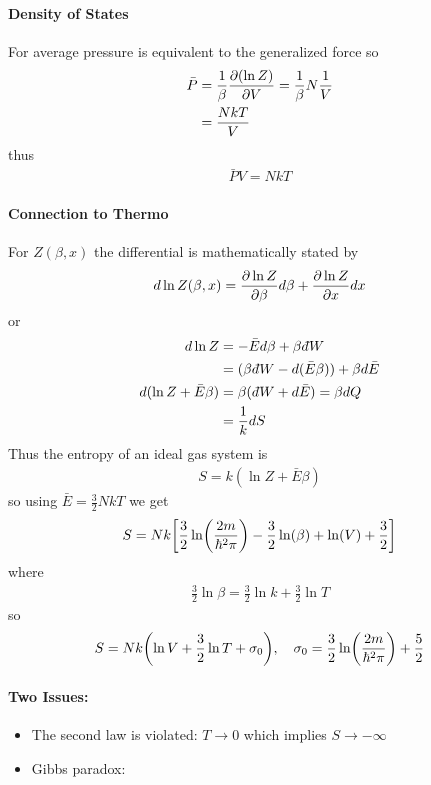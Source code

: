 \documentclass[../main.tex]{subfiles}
\begin{document}
\paragraph{Density of States} For average pressure is equivalent to the generalized force so
\begin{align*}
    \bar P &= \frac{1}{\beta} \pdv{(\ln Z)}{V} = \frac{1}{\beta} N \frac{1}{V} \\
    &= \frac{NkT}{V}
\end{align*}
thus
\begin{align*}
    \bar P V = NkT 
\end{align*}

\paragraph{Connection to Thermo} For $Z(\beta, x)$ the differential is mathematically stated by
\begin{align*}
    d\ln Z(\beta, x) = \pdv{\ln Z}{\beta} d\beta + \pdv{\ln Z}{x} dx 
\end{align*}
or 
\begin{align*}
    d \ln Z &= -\bar E d\beta + \beta d\hspace*{-0.08em}\bar{}\hspace*{0.1em} W \\
    &= (\beta d\hspace*{-0.08em}\bar{}\hspace*{0.1em} W - d(\bar E \beta)) + \beta d \bar E \\
    d(\ln Z + \bar E \beta) &= \beta(d\hspace*{-0.08em}\bar{}\hspace*{0.1em} W + d\bar E) = \beta dQ \\
    &= \frac{1}{k} dS
\end{align*}
Thus the entropy of an ideal gas system is
\begin{align*}
    S = k(\ln Z + \bar E \beta)
\end{align*}
so using $\bar E = \frac{3}{2} N kT$ we get
\begin{align*}
    S = Nk \qt[
        \frac{3}{2} \ln(\frac{2m}{\hbar^2\pi}) - \frac{3}{2} \ln(\beta) + \ln(V) + \frac{3}{2}
    ]
\end{align*}
where
\begin{align*}
    \frac{3}{2} \ln \beta = \frac{3}{2} \ln k + \frac{3}{2} \ln T
\end{align*}
so
\begin{align*}
    S = Nk \qt(
        \ln V + \frac{3}{2} \ln T + \sigma_0
    ), \quad \sigma_0 = \frac{3}{2} \ln(\frac{2m}{\hbar^2\pi}) + \frac{5}{2}
\end{align*}
\paragraph{Two Issues:}
\begin{itemize}
    \item The second law is violated: $T \to 0$ which implies $S \to -\infty$
    \item Gibbs paradox: 
\end{itemize}
\end{document}
